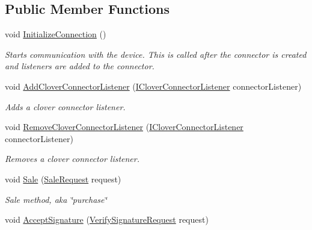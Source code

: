 \subsection*{Public Member Functions}
\begin{DoxyCompactItemize}
\item 
void \hyperlink{interfacecom_1_1clover_1_1remotepay_1_1sdk_1_1_i_clover_connector_a83c29b3d3a85f95c554a8464295acdb0}{Initialize\+Connection} ()
\begin{DoxyCompactList}\small\item\em Starts communication with the device. This is called after the connector is created and listeners are added to the connector. \end{DoxyCompactList}\item 
void \hyperlink{interfacecom_1_1clover_1_1remotepay_1_1sdk_1_1_i_clover_connector_a90fcd7781afc36d654e42b1c9daada87}{Add\+Clover\+Connector\+Listener} (\hyperlink{interfacecom_1_1clover_1_1remotepay_1_1sdk_1_1_i_clover_connector_listener}{I\+Clover\+Connector\+Listener} connector\+Listener)
\begin{DoxyCompactList}\small\item\em Adds a clover connector listener. \end{DoxyCompactList}\item 
void \hyperlink{interfacecom_1_1clover_1_1remotepay_1_1sdk_1_1_i_clover_connector_a4acba7cae456cb73a0acf4331cae04f9}{Remove\+Clover\+Connector\+Listener} (\hyperlink{interfacecom_1_1clover_1_1remotepay_1_1sdk_1_1_i_clover_connector_listener}{I\+Clover\+Connector\+Listener} connector\+Listener)
\begin{DoxyCompactList}\small\item\em Removes a clover connector listener. \end{DoxyCompactList}\item 
void \hyperlink{interfacecom_1_1clover_1_1remotepay_1_1sdk_1_1_i_clover_connector_acc92394e6902137c559510e498e78529}{Sale} (\hyperlink{classcom_1_1clover_1_1remotepay_1_1sdk_1_1_sale_request}{Sale\+Request} request)
\begin{DoxyCompactList}\small\item\em Sale method, aka \char`\"{}purchase\char`\"{} \end{DoxyCompactList}\item 
void \hyperlink{interfacecom_1_1clover_1_1remotepay_1_1sdk_1_1_i_clover_connector_ab31791ce69e05ca2e2b15269c2010a15}{Accept\+Signature} (\hyperlink{classcom_1_1clover_1_1remotepay_1_1sdk_1_1_verify_signature_request}{Verify\+Signature\+Request} request)

\end{DoxyCompactItemize}
